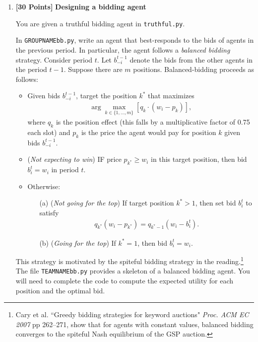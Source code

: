 \documentclass[11pt]{article}
\newcommand{\points}[1]{\textbf{[#1 Points]}}
\begin{document}
	\begin{enumerate}

		\item\points{30} {\bf Designing a bidding agent}

You are given a truthful bidding agent in \verb+truthful.py+.

In
\verb+GROUPNAMEbb.py+, write an agent that best-responds to the
bids of agents in the previous period. In particular, the agent follows
a {\em balanced bidding} strategy.  Consider period $t$. 
Let $b_{-i}^{t-1}$ denote the bids from the other
agents in the  period $t-1$.
Suppose there are $m$ positions. Balanced-bidding
proceeds as follows:
%
\begin{itemize}
\item Given bids $b_{-i}^{t-1}$, 
target the position $k^\ast$ that maximizes
%
\begin{align}
\arg\max_{k\in\{1,\ldots,m\}} [q_k\cdot (w_i - p_k)],
\end{align}
%
where $q_k$ is the position effect (this falls by a multiplicative
factor of 0.75 each slot) and $p_k$ is the price the agent would pay
for position $k$ given bids $b^{t-1}_{-i}$.

%
\item ({\em Not expecting to win}) 
IF price $p_{k^\ast}\geq w_i$ in this target position,
then bid $b^t_i=w_i$ in period $t$.
%
		\item Otherwise:
%
\begin{itemize}
\item[(a)] ({\em Not going for the top}) If target position $k^\ast>1$,
then set  bid $b^t_i$ to satisfy
%
\begin{align}
q_{k^\ast}(w_i - p_{k^\ast}) = q_{k^\ast - 1}(w_i - b^t_i).
\end{align}
%
%
\item[(b)] ({\em Going for the top}) If $k^\ast=1$, 
then bid
$b^t_i=w_i$.
\end{itemize}
	\end{itemize}

        This strategy is motivated by the spiteful bidding strategy in
        the reading.\footnote{Cary et al.  ``Greedy bidding strategies
          for keyword auctions" {\em Proc.  ACM EC 2007} pp 262--271,
          show that for agents with constant values, balanced bidding
          converges to the spiteful Nash equilibrium of the GSP
          auction.}
%
	The file \verb+TEAMNAMEbb.py+ provides a skeleton of a
        balanced bidding agent. You will need to complete
the code to compute the  expected
        utility for each position and the optimal bid.


\end{enumerate}
\end{document}
